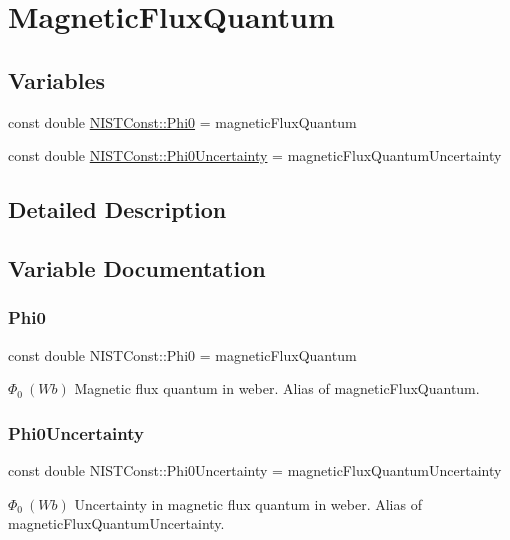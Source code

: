 \hypertarget{group___n_i_s_t_const-}{}\section{Magnetic\+Flux\+Quantum}
\label{group___n_i_s_t_const-}
\subsection*{Variables}
\begin{DoxyCompactItemize}
\item 
const double \hyperlink{group___n_i_s_t_const-_ga17c4e5dc1a9ccc86990f9236ffbc42a3}{N\+I\+S\+T\+Const\+::\+Phi0} = magnetic\+Flux\+Quantum
\item 
const double \hyperlink{group___n_i_s_t_const-_ga55c653d0966d0e6adb13e664c811d394}{N\+I\+S\+T\+Const\+::\+Phi0\+Uncertainty} = magnetic\+Flux\+Quantum\+Uncertainty
\end{DoxyCompactItemize}


\subsection{Detailed Description}


\subsection{Variable Documentation}
\mbox{\label{group___n_i_s_t_const-_ga17c4e5dc1a9ccc86990f9236ffbc42a3}} 
\subsubsection{\texorpdfstring{Phi0}{Phi0}}
{\footnotesize\ttfamily const double N\+I\+S\+T\+Const\+::\+Phi0 = magnetic\+Flux\+Quantum}

$\Phi_0 \ (Wb)$ Magnetic flux quantum in weber. Alias of magnetic\+Flux\+Quantum. \mbox{\label{group___n_i_s_t_const-_ga55c653d0966d0e6adb13e664c811d394}} 
\subsubsection{\texorpdfstring{Phi0\+Uncertainty}{Phi0Uncertainty}}
{\footnotesize\ttfamily const double N\+I\+S\+T\+Const\+::\+Phi0\+Uncertainty = magnetic\+Flux\+Quantum\+Uncertainty}

$\Phi_0 \ (Wb)$ Uncertainty in magnetic flux quantum in weber. Alias of magnetic\+Flux\+Quantum\+Uncertainty. 